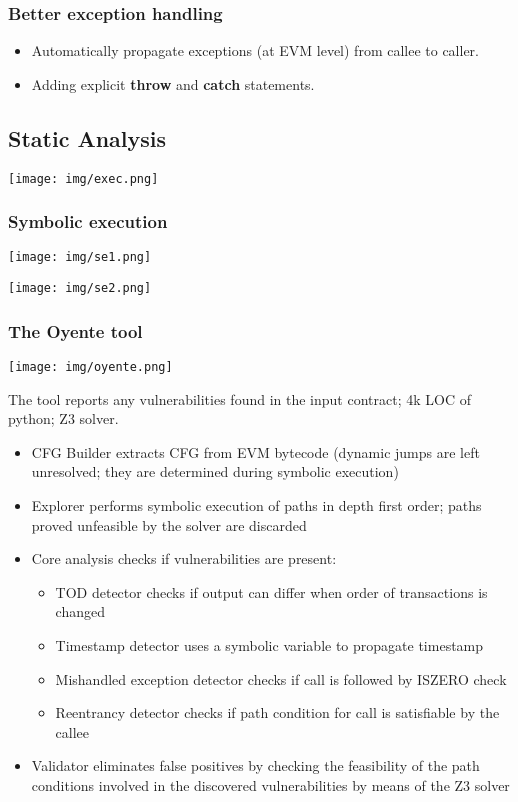 \documentclass[a4paper, 10pt, titlepage]{article}
\begin{document}
\subsubsection{Better exception handling}
\begin{itemize}
\item Automatically propagate exceptions (at EVM level) from callee to caller.
\item Adding explicit \textbf{throw} and \textbf{catch} statements.
\end{itemize}

\subsection{Static Analysis}
\begin{center}
\texttt{[image: img/exec.png]}
\end{center}

\subsubsection*{Symbolic execution}
\begin{flushleft}
\texttt{[image: img/se1.png]}
\end{flushleft}
\begin{flushright}
\texttt{[image: img/se2.png]}
\end{flushright}

\subsubsection{The Oyente tool}
\begin{center}
\texttt{[image: img/oyente.png]}
\end{center}
The tool reports any vulnerabilities found in the input contract; 4k LOC of python; Z3 solver.
\begin{itemize}
\item CFG Builder extracts CFG from EVM bytecode (dynamic jumps are left unresolved; they are determined during symbolic execution)
\item Explorer performs symbolic execution of paths in depth first order; paths proved unfeasible by the solver are discarded
\item Core analysis checks if vulnerabilities are present:
\begin{itemize}
\item TOD detector checks if output can differ when order of transactions is changed
\item Timestamp detector uses a symbolic variable to propagate timestamp
\item Mishandled exception detector checks if call is followed by ISZERO check
\item Reentrancy detector checks if path condition for call is satisfiable by the callee
\end{itemize}
\item Validator eliminates false positives by checking the feasibility of the path conditions
involved in the discovered vulnerabilities by means of the Z3 solver
\end{itemize}
\end{document}
